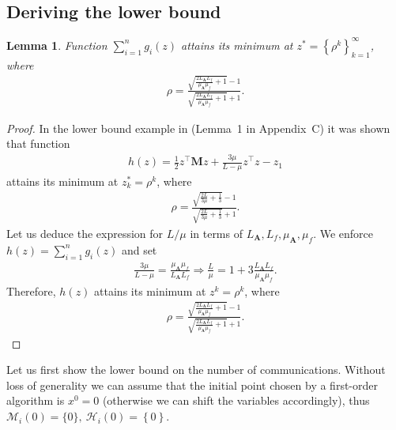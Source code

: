 \documentclass{article}
\newtheorem{lemma}{Lemma}
\newcommand{\cM}{\mathcal{M}}
\newcommand{\cH}{\mathcal{H}}
\newcommand{\mA}{\mathbf{A}}
\newcommand{\mM}{\mathbf{M}}
\newcommand{\braces}[1]{\left\{ #1 \right\}}
\begin{document}
\subsection{Deriving the lower bound}
\begin{lemma}
	Function $\sum_{i=1}^n g_i(z)$ attains its minimum at $z^* = \braces{\rho^k}_{k=1}^\infty$, where
	\begin{align*}
		\rho = \frac{\sqrt{\frac{2L_\mA L_f}{\mu_\mA \mu_f} + 1} - 1}{\sqrt{\frac{2L_\mA L_f}{\mu_\mA \mu_f} + 1} + 1}.
	\end{align*}
\end{lemma}
\begin{proof}
In the lower bound example in (Lemma~1 in Appendix~C) \cite{kovalev2021lower} it was shown that function
\begin{align*}
	h(z) = \frac{1}{2} z^\top \mM z + \frac{3\mu}{L - \mu} z^\top z - z_1
\end{align*}
attains its minimum at $z_k^* = \rho^k$, where
\begin{align*}
	\rho = \frac{\sqrt{\frac{2L}{3\mu} + \frac{1}{3}} - 1}{\sqrt{\frac{2L}{3\mu} + \frac{1}{3}} + 1}.
\end{align*}
Let us deduce the expression for $L / \mu$ in terms of $L_\mA, L_f, \mu_\mA, \mu_f$. We enforce $h(z) = \sum_{i=1}^n g_i(z)$ and set
\begin{align*}
	\frac{3\mu}{L - \mu} = \frac{\mu_\mA \mu_f}{L_\mA L_f}\Rightarrow \frac{L}{\mu} = 1 + 3\frac{L_\mA L_f}{\mu_\mA \mu_f}.
\end{align*}
Therefore, $h(z)$ attains its minimum at $z^k = \rho^k$, where
\begin{align*}
	\rho = \frac{\sqrt{\frac{2L_\mA L_f}{\mu_\mA \mu_f} + 1} - 1}{\sqrt{\frac{2L_\mA L_f}{\mu_\mA \mu_f} + 1} + 1}.
\end{align*}
\end{proof}
Let us first show the lower bound on the number of communications.
Without loss of generality we can assume that the initial point chosen by a first-order algorithm is $x^0 = 0$ (otherwise we can  shift the variables accordingly), thus $\cM_i(0) = \{0\},~ \cH_i(0) = \braces{0}$.
\end{document}
